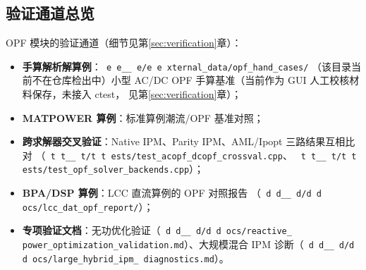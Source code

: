 \documentclass[UTF8,fontset=fandol,a4paper,11pt]{ctexart}
\makeatletter
\newcommand{\srcpath}[1]{\texttt{\src@scan#1\src@stop}}
\def\src@scan#1{%
  \ifx#1\src@stop
  \else
    \ifx#1\_\_\allowbreak\else
    \ifx#1/#1\allowbreak\else
    #1\fi\fi
    \expandafter\src@scan
  \fi}
\makeatother
\begin{document}
\subsection{验证通道总览}
OPF 模块的验证通道（细节见第\ref{sec:verification}章）：
\begin{itemize}
  \item \textbf{手算解析解算例}：\srcpath{external\_data/opf\_hand\_cases/}
        （该目录当前不在仓库检出中）小型
        AC/DC OPF 手算基准（当前作为 GUI 人工校核材料保存，未接入 ctest，
        见第\ref{sec:verification}章）；
  \item \textbf{MATPOWER 算例}：标准算例潮流/OPF 基准对照；
  \item \textbf{跨求解器交叉验证}：Native IPM、Parity IPM、AML/Ipopt 三路结果互相比对
        （\srcpath{tests/test\_acopf\_dcopf\_crossval.cpp}、
        \srcpath{tests/test\_opf\_solver\_backends.cpp}）；
  \item \textbf{BPA/DSP 算例}：LCC 直流算例的 OPF 对照报告
        （\srcpath{docs/lcc\_dat\_opf\_report/}）；
  \item \textbf{专项验证文档}：无功优化验证（\srcpath{docs/reactive\_\allowbreak
        power\_\allowbreak optimization\_\allowbreak validation.md}）、大规模混合 IPM
        诊断（\srcpath{docs/large\_\allowbreak hybrid\_\allowbreak ipm\_\allowbreak
        diagnostics.md}）。
\end{itemize}

\newpage











\end{document}
